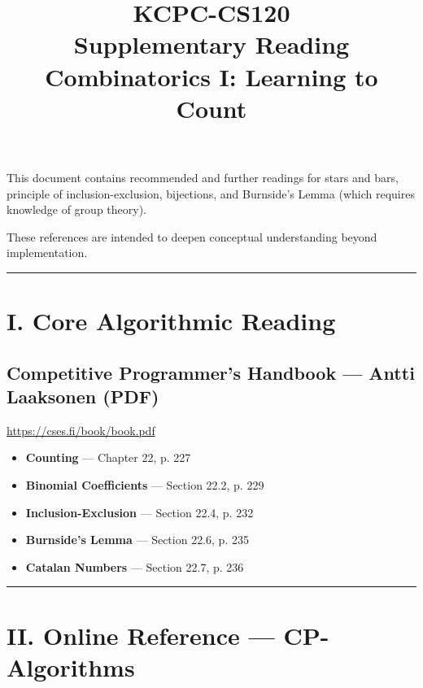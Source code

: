 \documentclass[11pt]{article}
\title{KCPC-CS120 \\ Supplementary Reading \\ Combinatorics I: Learning to Count}
\author{}
\date{}
\begin{document}
\maketitle

\noindent
This document contains recommended and further readings for stars and bars, principle of inclusion-exclusion, bijections, and Burnside's Lemma (which requires knowledge of group theory). 

These references are intended to deepen conceptual understanding beyond implementation.

\hrule
\vspace{1em}

\section*{I. Core Algorithmic Reading}

\subsection*{Competitive Programmer's Handbook --- Antti Laaksonen (PDF)}
\url{https://cses.fi/book/book.pdf}
\vspace{0.5em}
\begin{itemize}
    \item \textbf{Counting} --- Chapter 22, p. 227
    \item \textbf{Binomial Coefficients} --- Section 22.2, p. 229
    \item \textbf{Inclusion-Exclusion} --- Section 22.4, p. 232
    \item \textbf{Burnside's Lemma} --- Section 22.6, p. 235
    \item \textbf{Catalan Numbers} --- Section 22.7, p. 236
\end{itemize}

\vspace{1em}
\hrule
\vspace{1em}

\section*{II. Online Reference --- CP-Algorithms}
\end{document}
